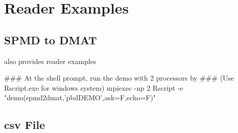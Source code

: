 
\section[Reader Examples]{Reader Examples}
\label{sec:reader_examples}


\subsection[SPMD to DMAT]{SPMD to DMAT}
\label{sec:spmd2dmat}

 also provides reader examples
\begin{Command}
### At the shell prompt, run the demo with 2 processors by
### (Use Rscript.exe for windows system)
mpiexec -np 2 Rscript -e "demo(spmd2dmat,'pbdDEMO',ask=F,echo=F)"
\end{Command}





\subsection[csv File]{csv File}
\label{sec:csv_files}

